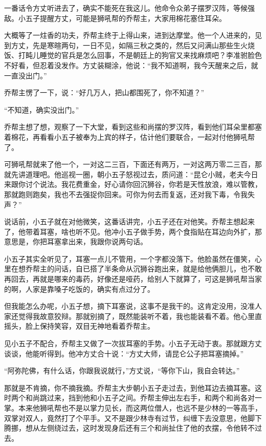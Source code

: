 一番话令方丈听进去了，确实不能死在我这儿。他命令众弟子摆罗汉阵，等候强敌。小五子提醒方丈，可能是狮吼帮的乔帮主，大家用棉花塞住耳朵。

大概等了一炷香的功夫，乔帮主终于上得山来，进到达摩堂。他一个人进来的，见到方丈，先是寒暄两句，一日不见，如隔三秋之类的，然后又问满山那些生火烧饭、打盹儿睡觉的官兵是怎么回事，不是朝廷上的狗官又来找麻烦吧？李准驸脸色不好看，但忍着没发作。方丈装糊涂，他说：“我不知道啊，我今天醒来之后，就一直没出门。”

乔帮主愣了一下，说：“好几万人，把山都围死了，你不知道？”

“不知道，确实没出门。”

乔帮主想了想，观察了一下大堂，看到这些和尚摆的罗汉阵，看到他们耳朵里都塞着棉花，再看看小五子被奉为上宾的样子，估计他们要联合，一起对付他狮吼帮了。

可狮吼帮就来了他一个，一对这二三百，下面还有两万，一对这两万零二三百，那就先讲道理吧。他巡视一圈，朝小五子怒视过去，质问道：“昆仑小贼，老夫今日来跟你讨个说法。我花费重金，好心请你回沉狮谷，你若是天性放浪，难以管教，那就跑则跑矣，我也不去强捉你回来。可你为何去而复返，还对我下毒，令我失声？”

说话前，小五子就在对他微笑，这番话讲完，小五子还在对他笑。乔帮主想起来了，他带着耳塞，啥也听不见。他冲小五子做手势，两个食指贴在耳边向外扩，那意思是，你把耳塞拿出来，我跟你说两句话。

小五子其实全听见了，耳塞一点儿不管用，一个字都没落下。他脸虽然在僵笑，心里在想乔帮主的问话，自已搭了半条命从沉狮谷跑出来，就是给他俩胆儿，也不敢再回去，再就是哪来的毒药，好像还是哑药，给别人下就算了，可这是狮吼帮当家的啊，人家是靠嗓子吃饭的，确实有点过分了。

但我能怎么办呢，小五子想，摘下耳塞说，这事不是我干的。这肯定没用，没准人家还觉得我故意狡辩。那就别摘了，既然能装听不着，我也能装看不着。他心里直摇头，脸上保持笑容，双目无神地看着乔帮主。

见小五子不配合，乔帮主又做了一次拔耳塞的手势。小五子无动于衷。那就跟方丈谈谈，他能听得到。他冲方丈合十说：“方丈大师，请昆仑公子把耳塞摘掉。”

“阿弥陀佛，有什么话，你跟我说就行，”方丈说，“等你下山，我自会转达。”

那就是不肯摘，你不摘我摘。乔帮主大步朝小五子走过去，到他耳边去摘耳塞。这时两个和尚跳过来，挡到他和小五子之间。乔帮主伸出左右手，和两个和尚各对一掌。本来他狮吼帮也不是以掌力见长，而这两位僧人，也远不是少林的一等高手，双掌对双人，竟然打了个平手。又不是跟少林寺有过节，纠缠下去没意思，他脚下腾挪，想从左侧绕过去，这时发现身后还有三个和尚扯住了他的衣摆，令他转不过去。

